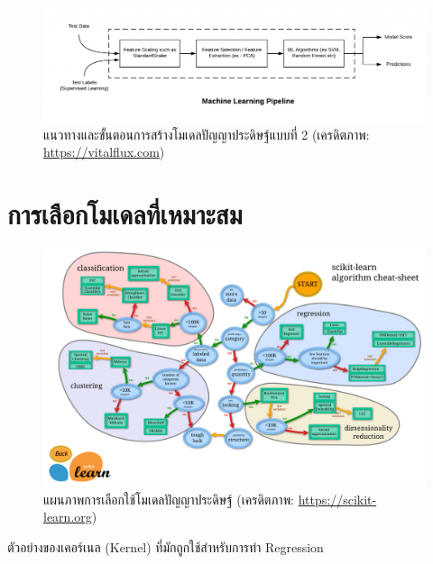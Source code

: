 \begin{figure}[htbp]
    \centering
    \includegraphics[width=\linewidth]{fig/ml_pipeline.png}
    \caption{แนวทางและขั้นตอนการสร้างโมเดลปัญญาประดิษฐ์แบบที่ 2 (เครดิตภาพ: \url{https://vitalflux.com})}
    \label{fig:ml_pipeline}
\end{figure}

\section{การเลือกโมเดลที่เหมาะสม}
\label{sec:choose_ml_model}

\begin{figure}[htbp]
    \centering
    \includegraphics[width=1.3\linewidth,angle=90]{fig/ml_map.png}
    \caption{แผนภาพการเลือกใช้โมเดลปัญญาประดิษฐ์ (เครดิตภาพ: \url{https://scikit-learn.org})}
    \label{fig:ml_map}
\end{figure}

ตัวอย่างของเคอร์เนล (Kernel) ที่มักถูกใช้สำหรับการทำ Regression

